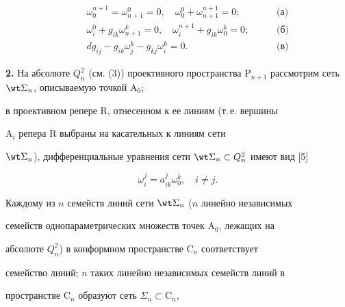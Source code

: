 \begin{equation} 


\begin{matrix} 


\ & \ & \omega^{n+1}_0=\omega^0_{n+1}=0,\quad 


\omega^0_0+\omega^{n+1}_{n+1}=0; & \ & \ & \text{(а)} \\[2mm]


\ & \ & \omega^0_i+g_{ik}\omega^k_{n+1}=0,\quad 


\omega^{n+1}_i+g_{ik}\omega^k_0=0; & \ & \ & \text{(б)}\\[2mm]


\ & \ & dg_{ij}-g_{ik}\omega^k_j- 


g_{kj}\omega^k_i=0. & \ & \ & \text{(в)} 


\end{matrix} 


\end{equation} 


 


{\bf 2.} На абсолюте $Q^2_n$ (см. (3)) проективного пространства $\mathrm 


P_{n+1}$ рассмотрим сеть $\wt\Sigma_n$, описываемую точкой $\mathrm A_0$; 


в проективном репере $\mathrm R$, отнесенном к ее линиям (т.\,е. вершины 


$\mathrm A_i$ репера $\mathrm R$ выбраны на касательных к линиям сети 


$\wt\Sigma_n$), дифференциальные уравнения сети $\wt\Sigma_n\subset 


Q^2_n$ имеют вид [5] 


\begin{equation} 


\omega^j_i=a^j_{ik}\omega^k_0,\quad i\ne j. 


\end{equation} 


 


Каждому из $n$ семейств линий сети $\wt\Sigma_n$ ($n$ линейно независимых 


семейств однопараметрических множеств точек $\mathrm A_0$, лежащих на 


абсолюте $Q^2_n$) в конформном пространстве $\mathrm C_n$ соответствует 


семейство линий; $n$ таких линейно независимых семейств линий в 


пространстве $\mathrm C_n$ образуют сеть $\Sigma_n\subset\mathrm C_n$, 


